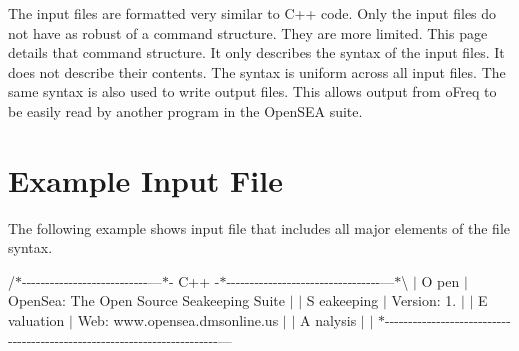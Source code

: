 The input files are formatted very similar to C++ code. Only the input files do not have as robust of a command structure. They are more limited. This page details that command structure. It only describes the syntax of the input files. It does not describe their contents. The syntax is uniform across all input files. The same syntax is also used to write output files. This allows output from o\-Freq to be easily read by another program in the Open\-S\-E\-A suite.\hypertarget{_input_syntax_example1}{}\section{Example Input File}\label{_input_syntax_example1}
The following example shows input file that includes all major elements of the file syntax.

/$\ast$-\/-\/-\/-\/-\/-\/-\/-\/-\/-\/-\/-\/-\/-\/-\/-\/-\/-\/-\/-\/-\/-\/-\/-\/-\/-\/-\/---$\ast$-\/ C++ -\/$\ast$-\/-\/-\/-\/-\/-\/-\/-\/-\/-\/-\/-\/-\/-\/-\/-\/-\/-\/-\/-\/-\/-\/-\/-\/-\/-\/-\/-\/-\/-\/-\/-\/-\/---$\ast$\textbackslash{} $|$ O pen $|$ Open\-Sea\-: The Open Source Seakeeping Suite $|$ $|$ S eakeeping $|$ Version\-: 1. $|$ $|$ E valuation $|$ Web\-: www.\-opensea.\-dmsonline.\-us $|$ $|$ A nalysis $|$ $|$ $\ast$-\/-\/-\/-\/-\/-\/-\/-\/-\/-\/-\/-\/-\/-\/-\/-\/-\/-\/-\/-\/-\/-\/-\/-\/-\/-\/-\/-\/-\/-\/-\/-\/-\/-\/-\/-\/-\/-\/-\/-\/-\/-\/-\/-\/-\/-\/-\/-\/-\/-\/-\/-\/-\/-\/-\/-\/-\/-\/-\/-\/-\/-\/-\/-\/-\/-\/-\/-\/-\/-\/-\/-\/--- 
